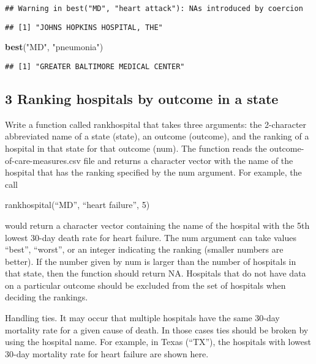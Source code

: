 \documentclass[
]{article}
\newenvironment{Shaded}{\begin{snugshade}}{\end{snugshade}}
\newcommand{\FunctionTok}[1]{\textcolor[rgb]{0.13,0.29,0.53}{\textbf{#1}}}
\newcommand{\NormalTok}[1]{#1}
\newcommand{\StringTok}[1]{\textcolor[rgb]{0.31,0.60,0.02}{#1}}
\begin{document}
\begin{verbatim}
## Warning in best("MD", "heart attack"): NAs introduced by coercion
\end{verbatim}

\begin{verbatim}
## [1] "JOHNS HOPKINS HOSPITAL, THE"
\end{verbatim}

\begin{Shaded}
\begin{Highlighting}[]
\FunctionTok{best}\NormalTok{(}\StringTok{"MD"}\NormalTok{, }\StringTok{"pneumonia"}\NormalTok{)}
\end{Highlighting}
\end{Shaded}

\begin{verbatim}
## [1] "GREATER BALTIMORE MEDICAL CENTER"
\end{verbatim}

\subsection{3 Ranking hospitals by outcome in a
state}\label{ranking-hospitals-by-outcome-in-a-state}

Write a function called rankhospital that takes three arguments: the
2-character abbreviated name of a state (state), an outcome (outcome),
and the ranking of a hospital in that state for that outcome (num). The
function reads the outcome-of-care-measures.csv file and returns a
character vector with the name of the hospital that has the ranking
specified by the num argument. For example, the call

rankhospital(``MD'', ``heart failure'', 5)

would return a character vector containing the name of the hospital with
the 5th lowest 30-day death rate for heart failure. The num argument can
take values ``best'', ``worst'', or an integer indicating the ranking
(smaller numbers are better). If the number given by num is larger than
the number of hospitals in that state, then the function should return
NA. Hospitals that do not have data on a particular outcome should be
excluded from the set of hospitals when deciding the rankings.

Handling ties. It may occur that multiple hospitals have the same 30-day
mortality rate for a given cause of death. In those cases ties should be
broken by using the hospital name. For example, in Texas (``TX''), the
hospitals with lowest 30-day mortality rate for heart failure are shown
here.
\end{document}
